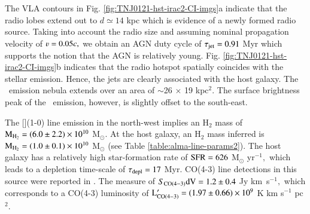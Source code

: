 The VLA contours in Fig. \ref{fig:TNJ0121-hst-irac2-CI-imgs}a indicate that the radio lobes extend out to $d \simeq 14$ kpc which is evidence of a newly formed radio source. Taking into account the radio size and assuming nominal propagation velocity of $\varv=0.05c,$ we obtain an AGN duty cycle of $\tau_{\rm jet} = 0.91$ Myr which supports the notion that the AGN is relatively young. Fig. \ref{fig:TNJ0121-hst-irac2-CI-imgs}b indicates that the radio hotspot spatially coincides with the stellar emission. Hence, the jets are clearly associated with the host galaxy. The \lya~emission nebula extends over an area of $\sim$26 $\times$ 19 kpc$^2.$ The surface brightness peak of the \lya~emission, however, is slightly offset to the south-east.  

The [](1-0) line emission in the north-west implies an H$_2$ mass of $\rm M_{\rm H_2} = (6.0 \pm 2.2)\times 10^{10}$ M$_\odot.$ At the host galaxy, an H$_2$ mass inferred is $\rm M_{\rm H_2} = (1.0 \pm 0.1)\times 10^{10}$ M$_\odot$ (see Table \ref{table:alma-line-params2}). The host galaxy has a relatively high star-formation rate of $\rm SFR=626$ M$_\odot$ yr$^{-1},$ which leads to a depletion time-scale of $\tau_{\rm depl} = 17$ Myr. CO(4-3) line detections in this source were reported in \citet{deBreuck2003}. The measure of $S_{\rm CO(4-3)}\rm dV=1.2\pm0.4$ Jy km~s$^{-1},$ which corresponds to a CO(4-3) luminosity of $\rm L'_{\rm CO(4-3)} = (1.97 \pm 0.66)\times 10^{9}$ K km s$^{-1}$ pc$^2$. 

